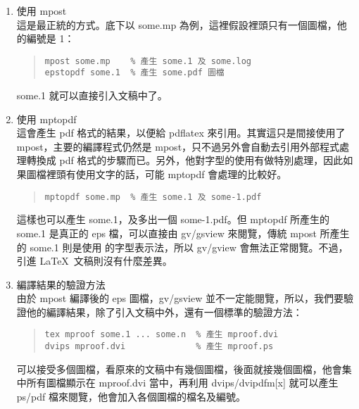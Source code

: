 \begin{enumerate}
  \item 使用 {\ttfamily mpost}\\
        這是最正統的方式。底下以 {\ttfamily some.mp} 為例，這裡假設裡頭只有一個圖檔，他的編號是 1：

        \begin{quote}
          \begin{verbatim}
mpost some.mp    % 產生 some.1 及 some.log
epstopdf some.1  % 產生 some.pdf 圖檔
\end{verbatim}
        \end{quote}

        {\ttfamily some.1} 就可以直接引入文稿中了。

  \item 使用 {\ttfamily mptopdf}\\
        這會產生 pdf 格式的結果，以便給 {\ttfamily pdflatex} 來引用。其實這只是間接使用了 {\ttfamily mpost}，主要的編譯程式仍然是 {\ttfamily mpost}，只不過另外會自動去引用外部程式處理轉換成 pdf 格式的步驟而已。另外，他對字型的使用有做特別處理，因此如果圖檔裡頭有使用文字的話，可能 {\ttfamily mptopdf} 會處理的比較好。

        \begin{quote}
          \begin{verbatim}
mptopdf some.mp  % 產生 some.1 及 some-1.pdf
\end{verbatim}
        \end{quote}

        這樣也可以產生 {\ttfamily some.1}，及多出一個 {\ttfamily some-1.pdf}。但 {\ttfamily mptopdf} 所產生的 {\ttfamily some.1} 是真正的 eps 檔，可以直接由 {\ttfamily gv/gsview} 來閱覽，傳統 {\ttfamily mpost} 所產生的 {\ttfamily some.1} 則是使用 \MP{} 的字型表示法，所以 {\ttfamily gv/gview} 會無法正常閱覽。不過，引進 \LaTeX\ 文稿則沒有什麼差異。

  \item 編譯結果的驗證方法\\
        由於 {\ttfamily mpost} 編譯後的 eps 圖檔，{\ttfamily gv/gsview} 並不一定能閱覽，所以，我們要驗證他的編譯結果，除了引入文稿中外，還有一個標準的驗證方法：

        \begin{quote}
          \begin{verbatim}
tex mproof some.1 ... some.n  % 產生 mproof.dvi
dvips mproof.dvi              % 產生 mproof.ps
\end{verbatim}
        \end{quote}

        可以接受多個圖檔，看原來的文稿中有幾個圖檔，後面就接幾個圖檔，他會集中所有圖檔顯示在 {\ttfamily mproof.dvi} 當中，再利用 {\ttfamily dvips/dvipdfm[x]} 就可以產生 ps/pdf 檔來閱覽，他會加入各個圖檔的檔名及編號。
\end{enumerate}

